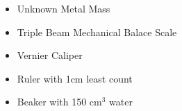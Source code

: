 \begin{itemize}
    \item {Unknown Metal Mass}
    \item {Triple Beam Mechanical Balace Scale}
    \item {Vernier Caliper}
    \item {Ruler with 1cm least count}
    \item {Beaker with 150 cm$^3$ water}
    \label{mat}
\end{itemize}


